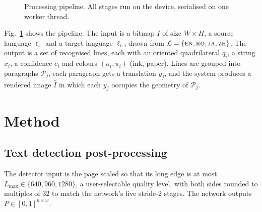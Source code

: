\documentclass[journal]{IEEEtran}
\theoremstyle{definition}
\begin{document}
\begin{figure}[t]
\centering
{}
\caption{Processing pipeline. All stages run on the device, serialised on one
worker thread.}
\label{fig:pipeline}
\end{figure}

Fig.~\ref{fig:pipeline} shows the pipeline. The input is a bitmap $I$ of size
$W\times H$, a source language $\ell_s$ and a target language $\ell_t$, drawn
from $\mathcal{L}=\{\textsc{en},\textsc{ko},\textsc{ja},\textsc{zh}\}$. The
output is a set of recognised lines, each with an oriented quadrilateral
$q_i$, a string $x_i$, a confidence $c_i$ and colours $(\kappa_i,\pi_i)$ (ink,
paper). Lines are grouped into paragraphs $\mathcal{P}_j$, each paragraph gets
a translation $y_j$, and the system produces a rendered image $\hat I$ in
which each $y_j$ occupies the geometry of $\mathcal{P}_j$.

\section{Method}

\subsection{Text detection post-processing}\label{sec:det}
The detector input is the page scaled so that its long edge is at most
$L_{\max}\in\{640,960,1280\}$, a user-selectable quality level, with both sides
rounded to multiples of $32$ to match the network's five stride-2 stages. The
network outputs $P\in[0,1]^{h\times w}$.
\end{document}
